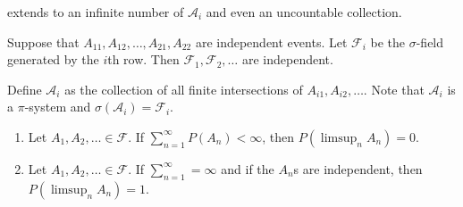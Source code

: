 \documentclass[class=article,crop=false]{standalone}
\begin{document}
\begin{thm}[4.2]
extends to an infinite number of $ \mathcal{A}_i$ and even an uncountable collection.
\end{thm}
\begin{coro}[]
	Suppose that $ A_{11}, A_{12},\ldots, A_{21}, A_{22}$ are independent events. 
Let $ \mathcal{F}_i$ be the $\sigma$-field generated by the $ i$th row. Then  $ \mathcal{F}_1,\mathcal{F}_2,\ldots$ are independent.
\end{coro}
\begin{prf}
	Define $ \mathcal{A}_i$ as the collection of all finite intersections of $ A_{i1}, A_{i2},\ldots$. Note that $ \mathcal{A}_i$ is a $ \pi$-system and $ \sigma(\mathcal{A}_i) = \mathcal{F}_i$.
\end{prf}

\begin{lem}
\begin{enumerate}[label=\arabic*)]
	\item Let $ A_1, A_2,\ldots \in \mathcal{F}$. If $ \sum_{ n= 1}^{\infty} P(A_n) < \infty$, then $ P(\limsup_{  n} A_n) = 0$.
	\item Let $ A_1,A_2,\ldots \in \mathcal{F}$. If $ \sum_{ n= 1}^{\infty} = \infty$ and if the $ A_n$s are independent, then $ P\left( \limsup_{  n} A_n \right) =1$.
\end{enumerate}
\end{lem}
\end{document}
